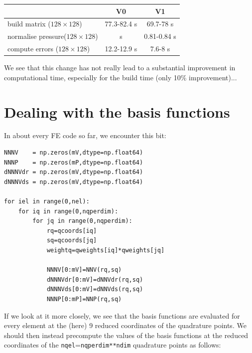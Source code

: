 \begin{center}
\begin{tabular}{lcc}
\hline
& V0 & V1 \\
\hline
\hline
build matrix      ($128\times 128$)& 77.3-82.4 s&  69.7-78 s \\
normalise pressure($128\times 128$)&           s&  0.81-0.84 s\\
compute errors    ($128\times 128$)& 12.2-12.9 s& 7.6-8 s    \\
\hline
\end{tabular}
\end{center}

We see that this change has not really lead to a substantial improvement in 
computational time, especially for the build time (only 10\% improvement)... 

\section*{Dealing with the basis functions}

In about every FE code so far, we encounter this bit:

\begin{lstlisting}
NNNV    = np.zeros(mV,dtype=np.float64) 
NNNP    = np.zeros(mP,dtype=np.float64) 
dNNNVdr = np.zeros(mV,dtype=np.float64) 
dNNNVds = np.zeros(mV,dtype=np.float64) 

for iel in range(0,nel):
    for iq in range(0,nqperdim):
        for jq in range(0,nqperdim):
            rq=qcoords[iq]
            sq=qcoords[jq]
            weightq=qweights[iq]*qweights[jq]

            NNNV[0:mV]=NNV(rq,sq)
            dNNNVdr[0:mV]=dNNVdr(rq,sq)
            dNNNVds[0:mV]=dNNVds(rq,sq)
            NNNP[0:mP]=NNP(rq,sq)
\end{lstlisting}
If we look at it more closely, we see that the basis functions are evaluated for every 
element at the (here) 9 reduced coordinates of the quadrature points. 
We should then instead precompute the values of the basis functions at the 
reduced coordinates of the {\tt nqel}={\tt nqperdim**ndim} quadrature points as follows:

